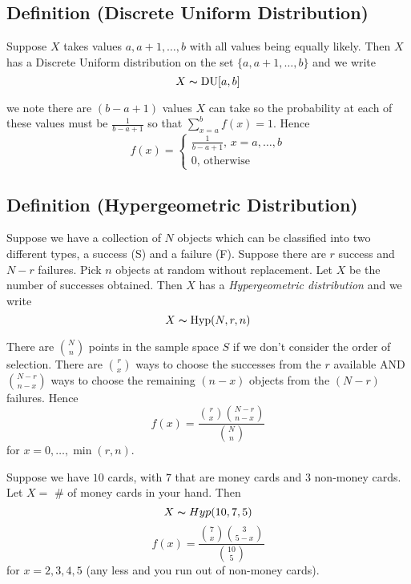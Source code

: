 \begin{defbox}
    \subsection{Definition (Discrete Uniform Distribution)}
    Suppose $ X $ takes values $ a,a+1,\ldots ,b $ with all values
    being equally likely. Then $ X $ has a Discrete Uniform distribution
    on the set $ \{a,a+1,\ldots ,b\} $ and we write
    \[ X \thicksim \operatorname{DU}[a,b] \]
\end{defbox}


we note there are $ (b-a+1) $ values $ X $ can take so the probability
at each of these values must be $ \frac{1}{b-a+1} $ so that
$ \sum\limits_{x=a}^{b} f(x)=1 $. Hence
\[ f(x)=
\begin{cases}
    \frac{1}{b-a+1},\,x=a,\ldots,b\\
    0,\,\text{otherwise}
\end{cases} \]

\begin{defbox}
    \subsection{Definition (Hypergeometric Distribution)}
    Suppose we have a collection of $ N $ objects which can be
    classified into two different types, a success (S) and a failure (F).
    Suppose there are $ r $ success and $ N-r $ failures. Pick $ n $
    objects at random without replacement. Let $ X $ be the number of successes
    obtained. Then $ X $ has a \emph{Hypergeometric distribution} and we write
    \[ X \thicksim \operatorname{Hyp}(N,r,n) \]
\end{defbox}


There are $ \binom{N}{n} $ points in the sample space $ S $ if we don't
consider the order of selection. There are $ \binom{r}{x} $ ways to choose
the successes from the $ r $ available AND $ \binom{N-r}{n-x} $ ways to choose
the remaining $ (n-x) $ objects from the $ (N-r) $ failures. Hence
\[ f(x)=\frac{\binom{r}{x}\binom{N-r}{n-x}}{\binom{N}{n}} \]
for $ x=0,\ldots ,\min(r,n) $.


Suppose we have $ 10 $ cards, with $ 7 $ that are money cards and $ 3 $
non-money cards. Let $ X= $ \# of money cards in your hand. Then
\[ X \thicksim Hyp(10,7,5) \]
\[ f(x)=\frac{\binom{7}{x}\binom{3}{5-x}}{\binom{10}{5}} \]
for $ x=2,3,4,5 $ (any less and you run out of non-money cards).

